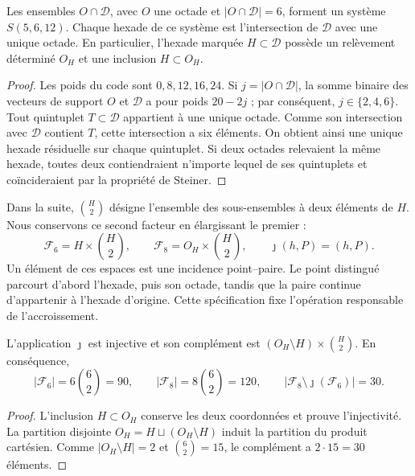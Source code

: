 \begin{proposition}
\label{rev4:ae:elevacion}
Les ensembles \(O\cap\mathscr D\), avec \(O\) une octade et
\(|O\cap\mathscr D|=6\), forment un système \(S(5,6,12)\).
Chaque hexade de ce système est l’intersection de \(\mathscr D\) avec
une unique octade. En particulier, l’hexade marquée \(H\subset\mathscr D\)
possède un relèvement déterminé \(O_H\) et une inclusion \(H\subset O_H\).
\end{proposition}
\begin{proof}
Les poids du code sont \(0,8,12,16,24\). Si
\(j=|O\cap\mathscr D|\), la somme binaire des vecteurs de support
\(O\) et \(\mathscr D\) a pour poids \(20-2j\) ; par conséquent,
\(j\in\{2,4,6\}\). Tout quintuplet \(T\subset\mathscr D\)
appartient à une unique octade. Comme son intersection avec \(\mathscr D\)
contient \(T\), cette intersection a six éléments. On obtient ainsi
une unique hexade résiduelle sur chaque quintuplet. Si deux octades relevaient
la même hexade, toutes deux contiendraient n’importe lequel de ses quintuplets et
coïncideraient par la propriété de Steiner.
\end{proof}

Dans la suite, \(\binom H2\) désigne l’ensemble des sous-ensembles à deux
éléments de \(H\). Nous conservons ce second facteur en élargissant le premier :
\begin{equation}
 \mathcal F_6=H\times\binom H2,
 \qquad
 \mathcal F_8=O_H\times\binom H2,
 \qquad
 \jmath(h,P)=(h,P).
 \label{rev4:ae:incidencias}
\end{equation}
Un élément de ces espaces est une incidence point--paire. Le point distingué parcourt d'abord l'hexade, puis son octade, tandis que la paire continue d'appartenir à l'hexade d'origine. Cette spécification fixe l'opération responsable de l'accroissement.

\begin{proposition}
\label{rev4:ae:incremento}
L’application \(\jmath\) est injective et son complément est
\((O_H\setminus H)\times\binom H2\). En conséquence,
\begin{equation}
 |\mathcal F_6|=6\binom62=90,
 \qquad |\mathcal F_8|=8\binom62=120,
 \qquad |\mathcal F_8\setminus\jmath(\mathcal F_6)|=30.
 \label{rev4:ae:cardinales}
\end{equation}
\end{proposition}
\begin{proof}
L’inclusion \(H\subset O_H\) conserve les deux coordonnées et prouve
l’injectivité. La partition disjointe \(O_H=H\sqcup(O_H\setminus H)\)
induit la partition du produit cartésien. Comme
\(|O_H\setminus H|=2\) et \(\binom62=15\), le complément a
\(2\cdot15=30\) éléments.
\end{proof}

